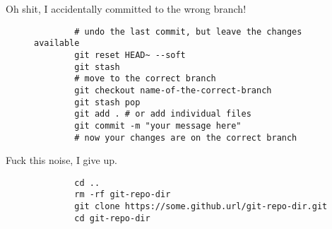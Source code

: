 \begin{frame}[fragile]{Oh shit, I accidentally committed to the wrong branch!}
    \begin{figure}
    \begin{lstlisting}
        # undo the last commit, but leave the changes available
        git reset HEAD~ --soft
        git stash
        # move to the correct branch
        git checkout name-of-the-correct-branch
        git stash pop
        git add . # or add individual files
        git commit -m "your message here"
        # now your changes are on the correct branch
        \end{lstlisting}
\end{figure}
\end{frame}

\begin{frame}[fragile]{Fuck this noise, I give up.}
    \begin{figure}
        \begin{lstlisting}
        cd ..
        rm -rf git-repo-dir
        git clone https://some.github.url/git-repo-dir.git
        cd git-repo-dir
        \end{lstlisting}
    \end{figure}
\end{frame}
